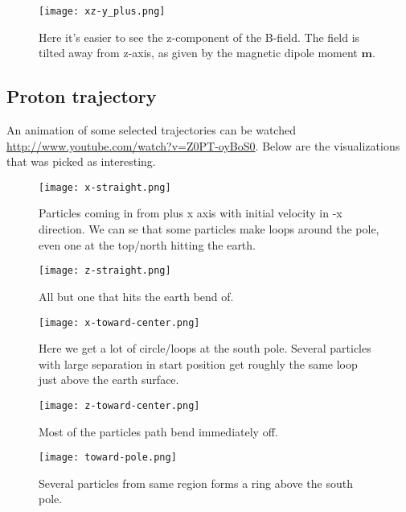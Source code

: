 \documentclass[11pt,a4paper]{article}
\begin{document}
\begin{center}
\begin{figure}[htbp] %
\label{figure.B-field}
\texttt{[image: xz-y\_plus.png]}
\caption{Here it's easier to see the z-component of the B-field. The field is tilted away from z-axis, as given by the magnetic dipole moment $\textbf{m}$.}
\end{figure}
\end{center}

\subsection{Proton trajectory}
An animation of some selected trajectories can be watched \href{here}{http://www.youtube.com/watch?v=Z0PT-oyBoS0}. Below are the visualizations that was picked as interesting.
\begin{center}
\begin{figure}[htbp] %
\label{figure.B-field}
\texttt{[image: x-straight.png]}
\caption{Particles coming in from plus x axis with initial velocity in -x direction. We can se that some particles make loops around the pole, even one at the top/north hitting the earth.}
\end{figure}
\end{center}
\begin{center}
\begin{figure}[htbp] %
\label{figure.B-field}
\texttt{[image: z-straight.png]}
\caption{All but one that hits the earth bend of.}
\end{figure}
\end{center}
\begin{center}
\begin{figure}[htbp] %
\label{figure.B-field}
\texttt{[image: x-toward-center.png]}
\caption{Here we get a lot of circle/loops at the south pole. Several particles with large separation in start position get roughly the same loop just above the earth surface.}
\end{figure}
\end{center}
\begin{center}
\begin{figure}[htbp] %
\label{figure.B-field}
\texttt{[image: z-toward-center.png]}
\caption{Most of the particles path bend immediately off.}
\end{figure}
\end{center}
\begin{center}
\begin{figure}[htbp] %
\label{figure.B-field}
\texttt{[image: toward-pole.png]}
\caption{Several particles from same region forms a ring above the south pole.}
\end{figure}
\end{center}
\end{document}

